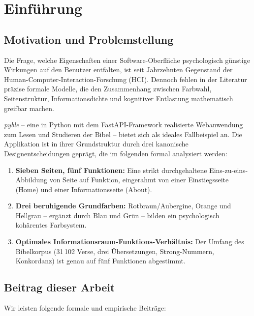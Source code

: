 ﻿\documentclass[a4paper,12pt]{article}
\theoremstyle{definition}
\begin{document}
\tableofcontents
\newpage

\section{Einführung}

\subsection{Motivation und Problemstellung}

Die Frage, welche Eigenschaften einer Software-Oberfläche psychologisch günstige
Wirkungen auf den Benutzer entfalten, ist seit Jahrzehnten Gegenstand der
Human-Computer-Interaction-Forschung (HCI). Dennoch fehlen in der Literatur
präzise formale Modelle, die den Zusammenhang zwischen Farbwahl, Seitenstruktur,
Informationsdichte und kognitiver Entlastung mathematisch greifbar machen.

\textit{pyble} -- eine in Python mit dem FastAPI-Framework realisierte Webanwendung
zum Lesen und Studieren der Bibel -- bietet sich als ideales Fallbeispiel an. Die
Applikation ist in ihrer Grundstruktur durch drei kanonische Designentscheidungen
geprägt, die im folgenden formal analysiert werden:

\begin{enumerate}
    \item \textbf{Sieben Seiten, fünf Funktionen:} Eine strikt durchgehaltene
          Eins-zu-eins-Abbildung von Seite auf Funktion, eingerahmt von einer
          Einstiegsseite (Home) und einer Informationsseite (About).
    \item \textbf{Drei beruhigende Grundfarben:} Rotbraun/Aubergine, Orange und
          Hellgrau -- ergänzt durch Blau und Grün -- bilden ein psychologisch
          kohärentes Farbsystem.
    \item \textbf{Optimales Informationsraum-Funktions-Verhältnis:} Der Umfang
          des Bibelkorpus (31\,102 Verse, drei Übersetzungen, Strong-Nummern,
          Konkordanz) ist genau auf fünf Funktionen abgestimmt.
\end{enumerate}

\subsection{Beitrag dieser Arbeit}

Wir leisten folgende formale und empirische Beiträge:
\end{document}

